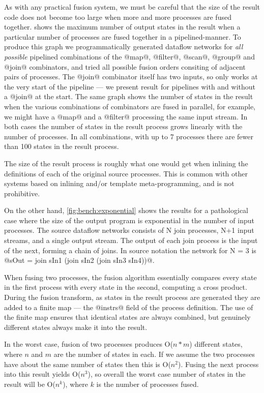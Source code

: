 As with any practical fusion system, we must be careful that the size of the result code does not become too large when more and more processes are fused together.
 shows the maximum number of output states in the result when a particular number of processes are fused together in a pipelined-manner.
To produce this graph we programmatically generated dataflow networks for \emph{all possible} pipelined combinations of the @map@, @filter@, @scan@, @group@ and @join@ combinators, and tried all possible fusion orders consiting of adjacent pairs of processes.
The @join@ combinator itself has two inputs, so only works at the very start of the pipeline --- we present result for pipelines with and without a @join@ at the start.
The same graph shows the number of states in the result when the various combinations of combinators are fused in parallel, for example, we might have a @map@ and a @filter@ processing the same input stream.
In both cases the number of states in the result process grows linearly with the number of processes. In all combinations, with up to 7 processes there are fewer than 100 states in the result process. 




The size of the result process is roughly what one would get when inlining the definitions of each of the original source processes. This is common with other systems based on inlining and/or template meta-programming, and is not prohibitive.

On the other hand, \cref{fig:bench:exponential} shows the results for a pathological case where the size of the output program is exponential in the number of input processes. The source dataflow networks consists of N join processes, N+1 input streams, and a single output stream. The output of each join process is the input of the next, forming a chain of joins. In source notation the network for N = 3 is @sOut = join sIn1 (join sIn2 (join sIn3 sIn4))@.

When fusing two processes, the fusion algorithm essentially compares every state in the first process with every state in the second, computing a cross product. During the fusion transform, as states in the result process are generated they are added to a finite map --- the @instrs@ field of the process definition. The use of the finite map ensures that identical states are always combined, but genuinely different states always make it into the result. 

In the worst case, fusion of two processes produces O($n*m$) different states, where $n$ and $m$ are the number of states in each. If we assume the two processes have about the same number of states then this is O($n^2$). Fusing the next process into this result yields O($n^3$), so overall the worst case number of states in the result will be O($n^k$), where $k$ is the number of processes fused. 

